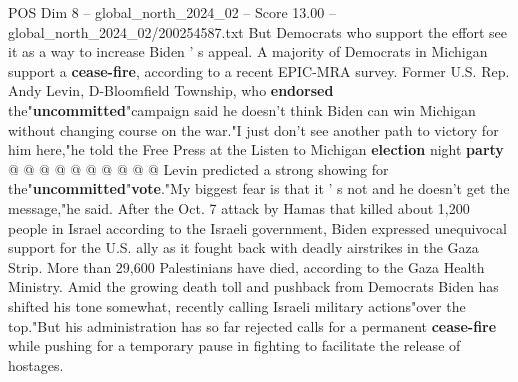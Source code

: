 \begin{textsample}{POS Dim 8 – global\_north\_2024\_02 – Score 13.00 – global\_north\_2024\_02/200254587.txt}
But Democrats who support the effort see it as a way to increase Biden ' s appeal.
A majority of Democrats in Michigan support a \textbf{cease-fire}, according to a recent EPIC-MRA survey.
Former U.S.
Rep.
Andy Levin, D-Bloomfield Township, who \textbf{endorsed} the"\textbf{uncommitted}"campaign said he doesn't think Biden can win Michigan without changing course on the war."I just don't see another path to victory for him here,"he told the Free Press at the Listen to Michigan \textbf{election} night \textbf{party} @ @ @ @ @ @ @ @ @ @ Levin predicted a strong showing for the"\textbf{uncommitted}"\textbf{vote}."My biggest fear is that it ' s not and he doesn't get the message,"he said.
After the Oct. 7 attack by Hamas that killed about 1,200 people in Israel according to the Israeli government, Biden expressed unequivocal support for the U.S. ally as it fought back with deadly airstrikes in the Gaza Strip.
More than 29,600 Palestinians have died, according to the Gaza Health Ministry.
Amid the growing death toll and pushback from Democrats Biden has shifted his tone somewhat, recently calling Israeli military actions"over the top."But his administration has so far rejected calls for a permanent \textbf{cease-fire} while pushing for a temporary pause in fighting to facilitate the release of hostages.

\end{textsample}
